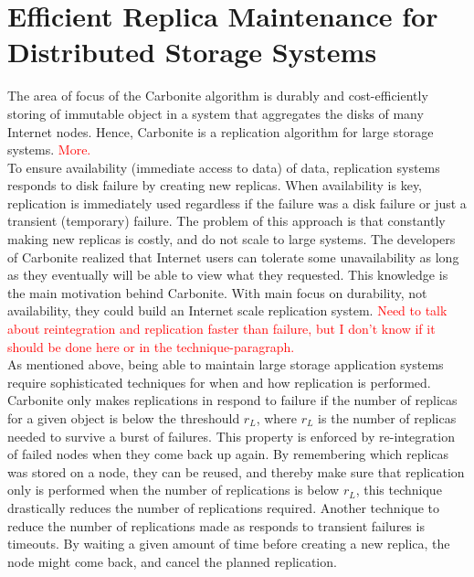 \documentclass{article}
\begin{document}
\section*{Efficient Replica Maintenance for Distributed Storage Systems}

The area of focus of the Carbonite algorithm is durably and cost-efficiently storing of immutable object in a system that aggregates the disks of many Internet nodes. Hence, Carbonite is a replication algorithm for large storage systems. \textcolor{red}{More.}\\

\noindent To ensure availability (immediate access to data) of data, replication systems responds to disk failure by creating new replicas. When availability is key, replication is immediately used regardless if the failure was a disk failure or just a transient (temporary) failure. The problem of this approach is that constantly making new replicas is costly, and do not scale to large systems. The developers of Carbonite realized that Internet users can tolerate some unavailability as long as they eventually will be able to view what they requested. This knowledge is the main motivation behind Carbonite. With main focus on durability, not availability, they could build an Internet scale replication system. \textcolor{red}{Need to talk about reintegration and replication faster than failure, but I don't know if it should be done here or in the technique-paragraph.}\\

\noindent As mentioned above, being able to maintain large storage application systems require sophisticated techniques for when and how replication is performed. Carbonite only makes replications in respond to failure if the number of replicas for a given object is below the threshould $r_L$, where $r_L$ is the number of replicas needed to survive a burst of failures. This property is enforced by re-integration of failed nodes when they come back up again. By remembering which replicas was stored on a node, they can be reused, and thereby make sure that replication only is performed when the number of replications is below $r_L$, this technique drastically reduces the number of replications required. Another technique to reduce the number of replications made as responds to transient failures is timeouts. By waiting a given amount of time before creating a new replica, the node might come back, and cancel the planned replication.\\
\end{document}

